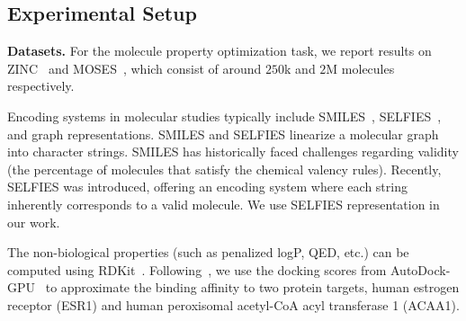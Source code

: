 \documentclass[accepted]{uai2023} %
\begin{document}

\subsection{Experimental Setup}
\textbf{Datasets.} For the molecule property optimization task, we report results on ZINC~\citep{irwin2012zinc} and MOSES~\citep{polykovskiy2020molecular}, which consist of around $250$k and $2$M molecules respectively. 

Encoding systems in molecular studies typically include SMILES~\citep{weininger1988smiles}, SELFIES~\citep{krenn2020self}, and graph representations. SMILES and SELFIES linearize a molecular graph into character strings. SMILES has historically faced challenges regarding validity (the percentage of molecules that satisfy the chemical valency rules). Recently, SELFIES was introduced, offering an encoding system where each string inherently corresponds to a valid molecule. 
We use SELFIES representation in our work. 

The non-biological properties (such as penalized logP, QED, etc.) can be computed using RDKit~\citep{landrum2013rdkit}. Following~\citep{eckmann2022limo}, we use the docking scores from AutoDock-GPU~\citep{santos2021accelerating} to approximate the binding affinity to two protein targets, human estrogen receptor (ESR1) and human peroxisomal acetyl-CoA acyl transferase 1 (ACAA1).
\end{document}
